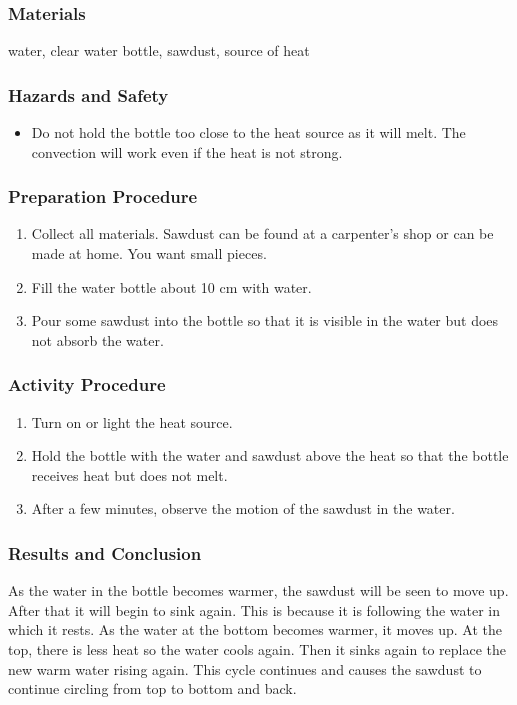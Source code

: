 \subsubsection*{Materials}
water, clear water bottle, sawdust, source of heat

\subsubsection*{Hazards and Safety}
\begin{itemize}
\item{Do not hold the bottle too close to the heat source as it will melt.  The convection will work even if the heat is not strong.}
\end{itemize}

\subsubsection*{Preparation Procedure}
\begin{enumerate}
\item{Collect all materials.  Sawdust can be found at a carpenter's shop or can be made at home.  You want small pieces.}
\item{Fill the water bottle about 10 cm with water.}
\item{Pour some sawdust into the bottle so that it is visible in the water but does not absorb the water.}
\end{enumerate}

\subsubsection*{Activity Procedure}
\begin{enumerate}
\item{Turn on or light the heat source.}
\item{Hold the bottle with the water and sawdust above the heat so that the bottle receives heat but does not melt.}
\item{After a few minutes, observe the motion of the sawdust in the water.}
\end{enumerate}

\subsubsection*{Results and Conclusion}
As the water in the bottle becomes warmer, the sawdust will be seen to move up.  After that it will begin to sink again.  This is because it is following the water in which it rests.  As the water at the bottom becomes warmer, it moves up.  At the top, there is less heat so the water cools again.  Then it sinks again to replace the new warm water rising again.  This cycle continues and causes the sawdust to continue circling from top to bottom and back.

